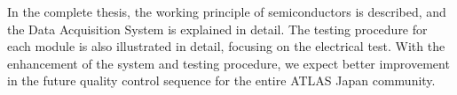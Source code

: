\documentclass{article}
\begin{document}
\thispagestyle{empty}
In the complete thesis, the working principle of
semiconductors is described, and the Data Acquisition System is explained in detail. The testing procedure for each module
is also illustrated in detail, focusing on the electrical test. 
With the enhancement of the system and testing procedure, we expect better 
improvement in the future quality control sequence for the entire ATLAS Japan community. 
\end{document}
